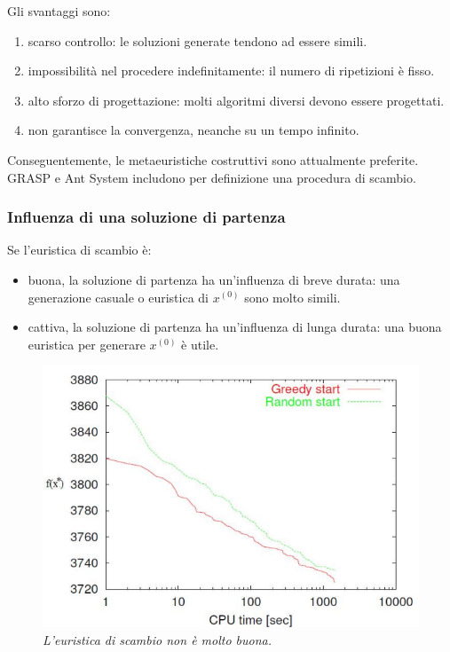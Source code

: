 \documentclass{article}
\begin{document}
Gli svantaggi sono:
\begin{enumerate}
    \item scarso controllo: le soluzioni generate tendono ad essere simili.
    \item impossibilità nel procedere indefinitamente: il numero di ripetizioni è fisso.
    \item alto sforzo di progettazione: molti algoritmi diversi devono essere progettati.
    \item non garantisce la convergenza, neanche su un tempo infinito.
\end{enumerate}
Conseguentemente, le metaeuristiche costruttivi sono attualmente preferite. GRASP e Ant System
includono per definizione una procedura di scambio.

\subsubsection{Influenza di una soluzione di partenza}
Se l'euristica di scambio è:
\begin{itemize}
    \item buona, la soluzione di partenza ha un'influenza di breve durata:
    una generazione casuale o euristica di $x^{(0)}$ sono molto simili.
    \item cattiva, la soluzione di partenza ha un'influenza di lunga durata:
    una buona euristica per generare $x^{(0)}$ è utile.
\end{itemize}
\begin{figure}[H]
    \centering
    \includegraphics[scale=0.5]{images/goodandbad.png}
    \caption{\textit{L'euristica di scambio non è molto buona.}}
\end{figure}
\end{document}
